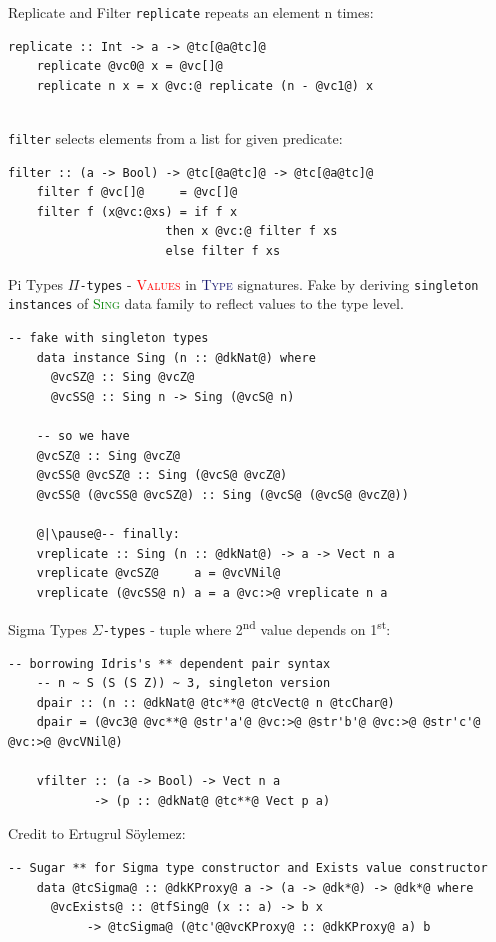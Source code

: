 \documentclass[xcolor={usenames,dvipsnames}]{beamer}
\newcommand{\htycon}[1]{\textcolor{MidnightBlue}{\textsc{#1}}}
\newcommand{\hvalcon}[1]{\textcolor{Red}{\textsc{#1}}}
\newcommand{\htyfam}[1]{\textcolor{Green}{\textsc{#1}}}
\begin{document}
\begin{frame}[fragile]{Replicate and Filter}
  \texttt{replicate} repeats an element n times:
  \begin{lstlisting}[style=hask]
    replicate :: Int -> a -> @tc[@a@tc]@
    replicate @vc0@ x = @vc[]@
    replicate n x = x @vc:@ replicate (n - @vc1@) x
  \end{lstlisting}

  \ \\
  \pause
  \texttt{filter} selects elements from a list for given predicate:
  \begin{lstlisting}[style=hask]
    filter :: (a -> Bool) -> @tc[@a@tc]@ -> @tc[@a@tc]@
    filter f @vc[]@     = @vc[]@
    filter f (x@vc:@xs) = if f x
                      then x @vc:@ filter f xs
                      else filter f xs
  \end{lstlisting}
\end{frame}

\begin{frame}[fragile]{Pi Types}
  \texttt{$\Pi$-types} - \hvalcon{Values} in \htycon{Type} signatures. Fake by deriving \texttt{singleton instances} of \htyfam{Sing} data family to reflect values to the type level.
  \begin{lstlisting}[style=hask]
    -- fake with singleton types
    data instance Sing (n :: @dkNat@) where
      @vcSZ@ :: Sing @vcZ@
      @vcSS@ :: Sing n -> Sing (@vcS@ n)

    -- so we have
    @vcSZ@ :: Sing @vcZ@
    @vcSS@ @vcSZ@ :: Sing (@vcS@ @vcZ@)
    @vcSS@ (@vcSS@ @vcSZ@) :: Sing (@vcS@ (@vcS@ @vcZ@))

    @|\pause@-- finally:
    vreplicate :: Sing (n :: @dkNat@) -> a -> Vect n a
    vreplicate @vcSZ@     a = @vcVNil@
    vreplicate (@vcSS@ n) a = a @vc:>@ vreplicate n a
  \end{lstlisting}
\end{frame}

\begin{frame}[fragile]{Sigma Types}
  \texttt{$\Sigma$-types} - tuple where 2\textsuperscript{nd} value depends on 1\textsuperscript{st}:
  \begin{lstlisting}[style=hask]
    -- borrowing Idris's ** dependent pair syntax
    -- n ~ S (S (S Z)) ~ 3, singleton version
    dpair :: (n :: @dkNat@ @tc**@ @tcVect@ n @tcChar@)
    dpair = (@vc3@ @vc**@ @str'a'@ @vc:>@ @str'b'@ @vc:>@ @str'c'@ @vc:>@ @vcVNil@)

    vfilter :: (a -> Bool) -> Vect n a
            -> (p :: @dkNat@ @tc**@ Vect p a)
  \end{lstlisting}

  \pause
  Credit to Ertugrul S\"oylemez: 
  \begin{lstlisting}[style=hask]
    -- Sugar ** for Sigma type constructor and Exists value constructor
    data @tcSigma@ :: @dkKProxy@ a -> (a -> @dk*@) -> @dk*@ where
      @vcExists@ :: @tfSing@ (x :: a) -> b x
           -> @tcSigma@ (@tc'@@vcKProxy@ :: @dkKProxy@ a) b
  \end{lstlisting}
\end{frame}
\end{document}
